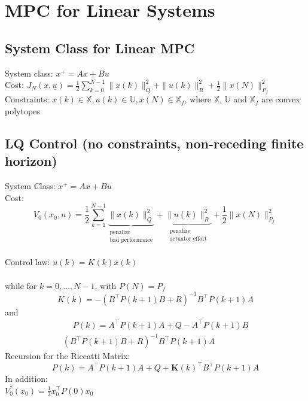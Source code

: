 \documentclass[english]{latex4ei/latex4ei_sheet}
\begin{document}
\section{MPC for Linear Systems}
\begin{sectionbox}

\subsection{System Class for Linear MPC}
System class: $x^{+}=A x+B u$ \\
Cost: $J_{N}(x, \underline{u})=\frac{1}{2} \sum\limits_{k=0}^{N-1}\|x(k)\|_{Q}^{2}+\|u(k)\|_{R}^{2}+\frac{1}{2}\|x(N)\|_{P_{f}}^{2}$ \\
Constraints: $x(k) \in \mathbb{X}, u(k) \in \mathbb{U}, x(N) \in \mathbb{X}_{f}$, where $\mathbb{X}$, $\mathbb{U}$ and $\mathbb{X}_{f}$ are convex polytopes\\

\subsection{LQ Control (no constraints, non-receding finite horizon)}
System Class: $x^{+}=A x+B u$ \\
Cost: $$V_{0}\left(x_{0}, u\right)=\frac{1}{2} \sum_{k=1}^{N-1}\underbrace{\|x(k)\|_{Q}^{2}}_{\substack{\text{penalize} \\ \text{bad performance}}}+\underbrace{\|u(k)\|_{R}^{2}}_{\substack{\text{penalize} \\ \text{actuator effort}}}+\frac{1}{2}\|x(N)\|_{P_{f}}^{2}$$ \\
Control law: $u(k)=K(k) x(k)$ \\
\\
while for $k=0, \ldots, N-1$, with $P(N)=P_{f}$
$$K(k)=-\left(B^{\top} P(k+1) B+R\right)^{-1} B^{\top} P(k+1) A$$ and
\begin{multline*}
    \quad\ P(k)=A^{\top} P(k+1) A+Q-A^{\top} P(k+1) B\\\left(B^{\top} P(k+1) B+R\right)^{-1} B^{\top} P(k+1) A
\end{multline*}
Recursion for the Riccatti Matrix:
$$P(k)=A^{\top} P(k+1) A+Q+\boldsymbol{K}(k)^{\top}B^{\top} P(k+1)A$$
In addition:\\ 
$V_{0}^{*}\left(x_{0}\right)=\frac{1}{2} x_{0}^{\top} P(0) x_{0}$\\


\end{sectionbox}
\end{document}
